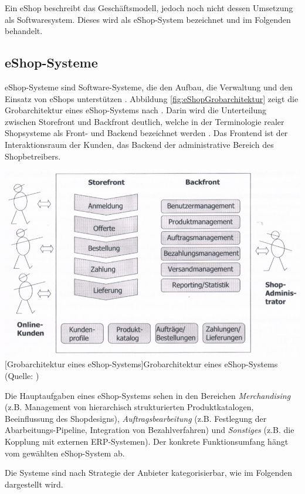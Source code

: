 \documentclass[11pt, a4paper, titlepage, listof=totoc, bibliography=totoc, index=totoc, twoside, openright, headings=normal]{scrreprt}
\begin{document}
Ein eShop beschreibt das Geschäftsmodell, jedoch noch nicht dessen Umsetzung als Softwaresystem. Dieses wird als eShop-System bezeichnet \citep{boles00} und im Folgenden behandelt.

\subsection{eShop-Systeme}
\label{eShop-Systeme}
\glqq eShop-Systeme sind Software-Systeme, die den Aufbau, die Verwaltung und den Einsatz von eShops unterstützen\grqq{} \citep{boles00}. Abbildung \ref{fig:eShopGrobarchitektur} zeigt die Grobarchitektur eines eShop-Systems nach \citet{meier12}. Darin wird die Unterteilung zwischen Storefront und Backfront deutlich, welche in der Terminologie realer Shopsysteme als Front- und Backend bezeichnet werden \citep[vgl.][]{shopwareDoku}. Das Frontend ist der Interaktionsraum der Kunden, das Backend der administrative Bereich des Shopbetreibers.

\vspace{1em}
\begin{minipage}{\linewidth}
	\centering
	\includegraphics[width=0.7\linewidth]{Abbildungen/eShopGrobarchitektur.png}
	[Grobarchitektur eines eShop-Systems]{Grobarchitektur eines eShop-Systems (Quelle: \citet{meier12})}
	\label{fig:eShopGrobarchitektur}
\end{minipage}
\vspace{0.2em}

Die Hauptaufgaben eines eShop-Systems sehen \citet{boles00} in den Bereichen \emph{Merchandising} (z.B. Management von hierarchisch strukturierten Produktkatalogen, Beeinflussung des Shopdesigns), \emph{Auftragsbearbeitung} (z.B. Festlegung der Abarbeitungs-Pipeline, Integration von Bezahlverfahren) und \emph{Sonstiges} (z.B. die Kopplung mit externen ERP-Systemen). Der konkrete Funktionsumfang hängt vom gewählten eShop-System ab.

Die Systeme sind nach Strategie der Anbieter kategorisierbar, wie im Folgenden dargestellt wird.
\end{document}
